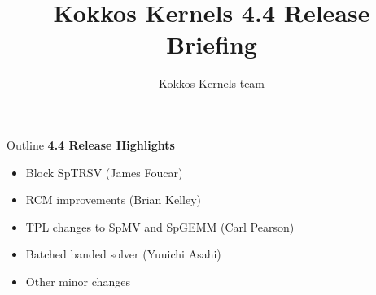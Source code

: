 
\usepackage{tikz}
\graphicspath{{kk_4_4/figures/}}

\title{Kokkos Kernels 4.4 Release Briefing}

\author{Kokkos Kernels team}




\shorttrue
\mediumfalse
\fullfalse



\begin{frame}
        \titlepage
\end{frame}



\begin{frame}[fragile]{Outline}
\textbf{4.4 Release Highlights}
    \begin{itemize}
      \item {Block SpTRSV} (James Foucar)
      \item {RCM improvements} (Brian Kelley)
      \item {TPL changes to SpMV and SpGEMM} (Carl Pearson)
      \item {Batched banded solver} (Yuuichi Asahi)
      \item {Other minor changes}
    \end{itemize}
\end{frame}



